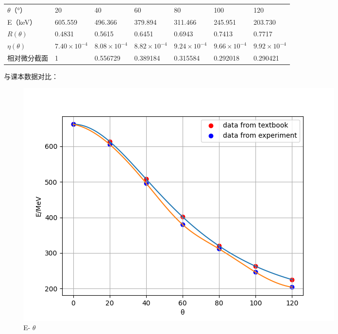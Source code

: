 \documentclass[font=default]{mpltx}
\begin{document}
\begin{table}[]
\begin{tabular}{llll}
$\theta$（°）         & 20                     &40                             &60                   &80                     &100                        &120 \\
E（keV）              & 605.559               &496.366                        &379.894                 &311.466              &245.951                 &203.730 \\
$R(\theta)$          & 0.4831                 &0.5615                           &0.6451              &0.6943                 &0.7413                    &0.7717 \\
$\eta(\theta)$     & $7.40 \times {10}^{-4}$  & $8.08 \times {10}^{-4}$  &$8.82 \times {10}^{-4}$ &$9.24 \times {10}^{-4}$  &$9.66 \times {10}^{-4}$     &$9.92 \times {10}^{-4}$    \\
相对微分截面          & 1                     &0.556729                         &0.389184               &0.315584            &0.292018                     &0.290421  \\
\end{tabular}
\end{table}

与课本数据对比：

\begin{figure}
  \centering
  \includegraphics[width=0.85\linewidth]{fig/figure_1.png}
  \caption{E- $\theta$}
  \label{sec:figure_1}
\end{figure}
\end{document}
